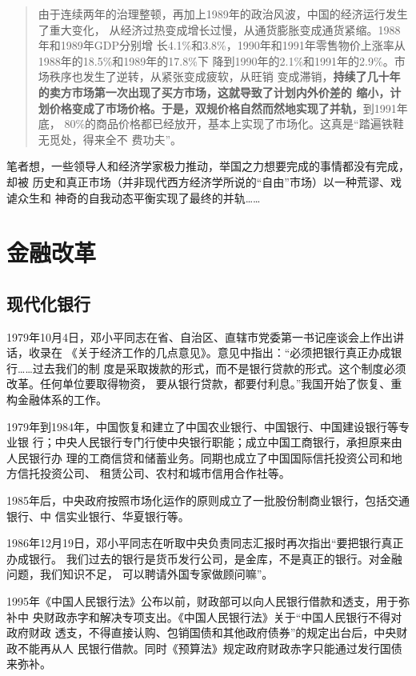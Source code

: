 \begin{quotation}
  由于连续两年的治理整顿，再加上1989年的政治风波，中国的经济运行发生了重大变化，
  从经济过热变成增长过慢，从通货膨胀变成通货紧缩。1988年和1989年GDP分别增
  长4.1\%和3.8\%，1990年和1991年零售物价上涨率从1988年的18.5\%和1989年的17.8\%下
  降到1990年的2.1\%和1991年的2.9\%。市场秩序也发生了逆转，从紧张变成疲软，从旺销
  变成滞销，\textbf{持续了几十年的卖方市场第一次出现了买方市场，这就导致了计划内外价差的
  缩小，计划价格变成了市场价格。于是，双规价格自然而然地实现了并轨，}到1991年底，
  80\%的商品价格都已经放开，基本上实现了市场化。这真是“踏遍铁鞋无觅处，得来全不
  费功夫”。\cite[579]{fengyunshi1b}
\end{quotation}

笔者想，一些领导人和经济学家极力推动，举国之力想要完成的事情都没有完成，却被
历史和真正市场（并非现代西方经济学所说的“自由”市场）以一种荒谬、戏谑众生和
神奇的自我动态平衡实现了最终的并轨……


\section{金融改革}
\label{sec:huilv78}

\subsection{现代化银行}

1979年10月4日，邓小平同志在省、自治区、直辖市党委第一书记座谈会上作出讲话，收录在
《关于经济工作的几点意见》。意见中指出：“必须把银行真正办成银行……过去我们的制
度是采取拨款的形式，而不是银行贷款的形式。这个制度必须改革。任何单位要取得物资，
要从银行贷款，都要付利息。”我国开始了恢复、重构金融体系的工作。

1979年到1984年，中国恢复和建立了中国农业银行、中国银行、中国建设银行等专业银
行；中央人民银行专门行使中央银行职能；成立中国工商银行，承担原来由人民银行办
理的工商信贷和储蓄业务。同期也成立了中国国际信托投资公司和地方信托投资公司、
租赁公司、农村和城市信用合作社等。

1985年后，中央政府按照市场化运作的原则成立了一批股份制商业银行，包括交通银行、中
信实业银行、华夏银行等。

1986年12月19日，邓小平同志在听取中央负责同志汇报时再次指出“要把银行真正办成银行。
我们过去的银行是货币发行公司，是金库，不是真正的银行。对金融问题，我们知识不足，
可以聘请外国专家做顾问嘛”。

1995年《中国人民银行法》公布以前，财政部可以向人民银行借款和透支，用于弥补中
央财政赤字和解决专项支出。《中国人民银行法》关于“中国人民银行不得对政府财政
透支，不得直接认购、包销国债和其他政府债券”的规定出台后，中央财政不能再从人
民银行借款。同时《预算法》规定政府财政赤字只能通过发行国债来弥补。

